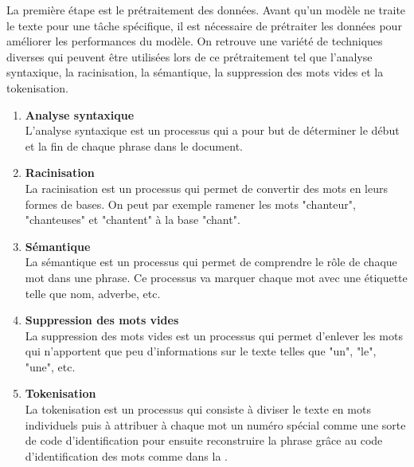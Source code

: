 \documentclass{rapport}
\begin{document}
La première étape est le prétraitement des données. Avant qu'un modèle ne traite le texte pour une tâche spécifique, il est nécessaire de prétraiter les données pour améliorer les performances du modèle. On retrouve une variété de techniques diverses qui peuvent être utilisées lors de ce prétraitement tel que l'analyse syntaxique, la racinisation, la sémantique, la suppression des mots vides et la tokenisation.
\begin{enumerate}[listparindent=0pt, parsep=0pt]

    \item \textbf{Analyse syntaxique}\\
    L'analyse syntaxique est un processus qui a pour but de déterminer le début et la fin de chaque phrase dans le document.\\
    
    \item \textbf{Racinisation}\\
    La racinisation est un processus qui permet de convertir des mots en leurs formes de bases. On peut par exemple ramener les mots "chanteur", "chanteuses" et "chantent" à la base "chant".\\ 
    
    \item \textbf{Sémantique}\\
    La sémantique est un processus qui permet de comprendre le rôle de chaque mot dans une phrase. Ce processus va marquer chaque mot avec une étiquette telle que nom, adverbe, etc.\\

    \item \textbf{Suppression des mots vides}\\
    La suppression des mots vides est un processus qui permet d'enlever les mots qui n'apportent que peu d'informations sur le texte telles que "un", "le", "une", etc.\\

    \item \textbf{Tokenisation}\\
    La tokenisation est un processus qui consiste à diviser le texte en mots individuels puis à attribuer à chaque mot un numéro spécial comme une sorte de code d'identification pour ensuite reconstruire la phrase grâce au code d'identification des mots comme dans la . 
\end{enumerate}
\end{document}
